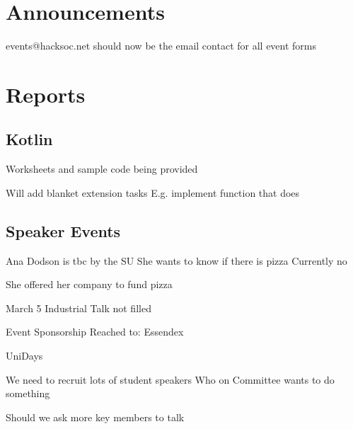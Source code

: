 \documentclass[11pt,hacksoc]{meetingmins}
\begin{document}
\maketitle

\section{Announcements}
\begin{items}
	\item
	events@hacksoc.net should now be the email contact for all event forms

\end{items}

\section{Reports}

\subsection{Kotlin}
\begin{hiddensubitems}
	\item
	Worksheets and sample code being provided
	
	\item
	Will add blanket extension tasks
		\subitem
		E.g. implement function that does
		
	\item
\end{hiddensubitems}

\subsection{Speaker Events}
\begin{hiddensubitems}
	\item
	Ana Dodson is tbc by the SU
		\subitem
		She wants to know if there is pizza
			\subsubitem
			Currently no
			
		\subitem
		She offered her company to fund pizza
		
	\item
	March 5 Industrial Talk not filled
		\subitem
	
	\item
	Event Sponsorship
		\subitem
		Reached to:
			\subsubitem
			Essendex
			
			\subsubitem
			UniDays
	
	\item
	We need to recruit lots of student speakers
		\subitem
		Who on Committee wants to do something
		
		\subitem
		Should we ask more key members to talk
	
	
\end{hiddensubitems}
\end{document}
